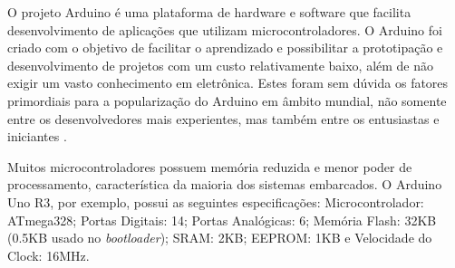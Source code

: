 \documentclass[12pt]{uftpibicsic2020}
\begin{document}




O projeto Arduino é uma plataforma de hardware e software que facilita desenvolvimento de aplicações que utilizam microcontroladores. O Arduino foi criado com o objetivo de facilitar o aprendizado e possibilitar a prototipação e desenvolvimento de projetos com um custo relativamente baixo, além de não exigir um vasto conhecimento em eletrônica. Estes foram sem dúvida os fatores primordiais para a popularização do Arduino em âmbito mundial, não somente entre os desenvolvedores mais experientes, mas também entre os entusiastas e iniciantes \cite{marcos}.

Muitos microcontroladores possuem memória reduzida e menor poder de processamento, característica da maioria dos sistemas embarcados. O Arduino Uno R3, por exemplo, possui as seguintes especificações: Microcontrolador: ATmega328; Portas Digitais: 14; Portas Analógicas: 6; Memória Flash: 32KB (0.5KB usado no {\it bootloader}); SRAM: 2KB; EEPROM: 1KB e Velocidade do Clock: 16MHz.
\end{document}
